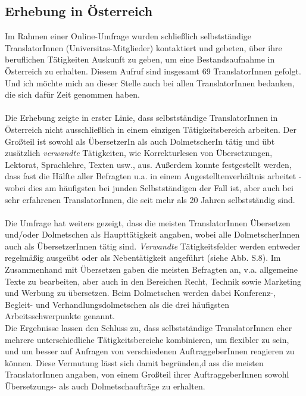 \documentclass{article}
\begin{document}
	\subsection*{Erhebung in Österreich}
	Im Rahmen einer Online-Umfrage wurden schließlich selbstständige TranslatorInnen (Universitas-Mitglieder) kontaktiert und gebeten, über ihre beruflichen Tätigkeiten Auskunft zu geben, um eine Bestandsaufnahme in Österreich zu erhalten. Diesem Aufruf sind insgesamt 69 TranslatorInnen gefolgt. Und ich möchte mich an dieser Stelle auch bei allen TranslatorInnen bedanken, die sich dafür Zeit genommen haben. \\ \\
	Die Erhebung zeigte in erster Linie, dass selbstständige TranslatorInnen in Österreich nicht ausschließlich in einem einzigen Tätigkeitsbereich arbeiten. Der Großteil ist sowohl als ÜbersetzerIn als auch DolmetscherIn tätig und übt zusätzlich \textit{verwandte} Tätigkeiten, wie Korrekturlesen von Übersetzungen, Lektorat, Sprachlehre, Texten usw., aus. Außerdem konnte festgestellt werden, dass fast die Hälfte aller Befragten u.a. in einem Angestelltenverhältnis arbeitet - wobei dies am häufigsten bei junden Selbstständigen der Fall ist, aber auch bei sehr erfahrenen TranslatorInnen, die seit mehr als 20 Jahren selbstständig sind. \\ \\
	Die Umfrage hat weiters gezeigt, dass die meisten TranslatorInnen Übersetzen und/oder Dolmetschen als Haupttätigkeit angaben, wobei alle DolmetscherInnen auch als ÜbersetzerInnen tätig sind. \textit{Verwandte} Tätigkeitsfelder werden entweder regelmäßig ausgeübt oder als Nebentätigkeit angeführt (siehe Abb. S.8). Im Zusammenhand mit Übersetzen gaben die meisten Befragten an, v.a. allgemeine Texte zu bearbeiten, aber auch in den Bereichen Recht, Technik sowie Marketing und Werbung zu übersetzen. Beim Dolmetschen werden dabei Konferenz-, Begleit- und Verhandlungsdolmetschen als die drei häufigsten Arbeitsschwerpunkte genannt. \\
	Die Ergebnisse lassen den Schluss zu, dass selbstständige TranslatorInnen eher mehrere unterschiedliche Tätigkeitsbereiche kombinieren, um flexibler zu sein, und um besser auf Anfragen von verschiedenen AuftraggeberInnen reagieren zu können. Diese Vermutung lässt sich damit begründen,d ass die meisten TranslatorInnen angaben, von einem Großteil ihrer AuftraggeberInnen sowohl Übersetzungs- als auch Dolmetschaufträge zu erhalten. \\ \\
\end{document}
